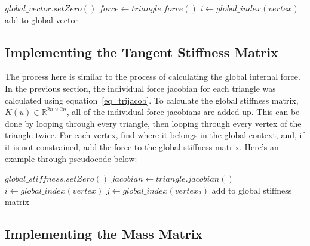\documentclass[twocolumn,10pt]{asme2ej}
\begin{document}
\begin{algorithmic}[1]
        \State $global\_vector.setZero()$
         \State $force \gets triangle.force()$
                  \State $i \gets global\_index(vertex)$
                  \State add to global vector
              \EndIf
            \EndFor
        \EndFor
    \EndFunction
\end{algorithmic}

\subsection{Implementing the Tangent Stiffness Matrix}

The process here is similar to the process of calculating the global internal force. In the previous section, the individual force jacobian for each triangle was calculated using equation~\ref{eq_trijacob}. To calculate the global stiffness matrix, $K(u) \in \mathbb{R}^{2n \times 2n}$, all of the individual force jacobians are added up. This can be done by looping through every triangle, then looping through every vertex of the triangle twice. For each vertex, find where it belongs in the global context, and, if it is not constrained, add the force to the global stiffness matrix. Here's an example through pseudocode below:

\begin{algorithmic}[1]
        \State $global\_stiffness.setZero()$
         \State $jacobian \gets triangle.jacobian()$
                  \State $i \gets global\_index(vertex)$
                          \State $j \gets global\_index(vertex_2)$
                          \State add to global stiffness matrix
                      \EndIf
                    \EndFor
              \EndIf
            \EndFor
        \EndFor
    \EndFunction
\end{algorithmic}

\subsection{Implementing the Mass Matrix}
\end{document}
